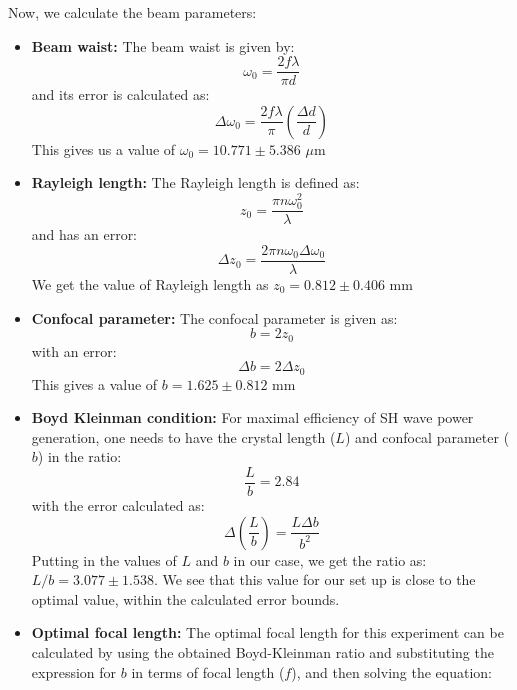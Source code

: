 Now, we calculate the beam parameters:
\begin{itemize}
\item \textbf{Beam waist:} The beam waist is given by: 
\begin{equation}
\omega_{0}=\dfrac{2f\lambda}{\pi d}
\end{equation}
and its error is calculated as:
\begin{equation}
\Delta \omega_{0}=\dfrac{2f\lambda}{\pi}\left(\dfrac{\Delta d}{d}\right)
\end{equation}
This gives us a value of $\omega_{0}=10.771\pm 5.386$ $\mu$m
\item \textbf{Rayleigh length:} The Rayleigh length is defined as:
\begin{equation}
z_{0}=\dfrac{\pi n \omega_{0}^{2}}{\lambda}
\end{equation}
and has an error:
\begin{equation}
\Delta z_{0}=\dfrac{2\pi n \omega_{0}\Delta \omega_{0}}{\lambda}
\end{equation}
We get the value of Rayleigh length as $z_{0}=0.812\pm 0.406$ mm
\item \textbf{Confocal parameter:} The confocal parameter is given as:
\begin{equation}
b=2z_{0}
\end{equation}
with an error:
\begin{equation}
\Delta b=2\Delta z_{0}
\end{equation}
This gives a value of $b=1.625\pm 0.812$ mm
\item \textbf{Boyd Kleinman condition:} For maximal efficiency of SH wave power generation, one needs to have the crystal length ($L$) and confocal parameter ($b$) in the ratio: 
\begin{equation}
\dfrac{L}{b}=2.84
\end{equation}
with the error calculated as: 
\begin{equation}
\Delta \left(\dfrac{L}{b}\right)=\dfrac{L\Delta b}{b^{2}}
\end{equation}
Putting in the values of $L$ and $b$ in our case, we get the ratio as: $L/b=3.077\pm 1.538$. We see that this value for our set up is close to the optimal value, within the calculated error bounds.
\item \textbf{Optimal focal length:} The optimal focal length for this experiment can be calculated by using the obtained Boyd-Kleinman ratio and substituting the expression for $b$ in terms of focal length ($f$), and then solving the equation:
$$
$$
\end{itemize}

